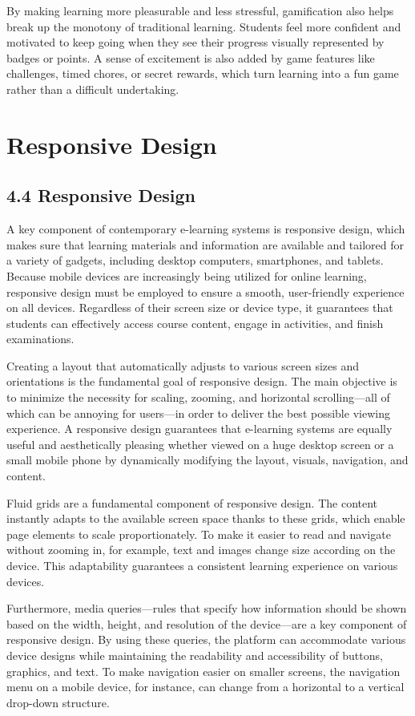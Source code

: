 \documentclass[BTech]{audiss}
\begin{document}
By making learning more pleasurable and less stressful, gamification also helps break up the monotony of traditional learning. Students feel more confident and motivated to keep going when they see their progress visually represented by badges or points. A sense of excitement is also added by game features like challenges, timed chores, or secret rewards, which turn learning into a fun game rather than a difficult undertaking.
\newpage
\section{Responsive Design}
\subsection{4.4 Responsive Design}
A key component of contemporary e-learning systems is responsive design, which makes sure that learning materials and information are available and tailored for a variety of gadgets, including desktop computers, smartphones, and tablets. Because mobile devices are increasingly being utilized for online learning, responsive design must be employed to ensure a smooth, user-friendly experience on all devices. Regardless of their screen size or device type, it guarantees that students can effectively access course content, engage in activities, and finish examinations.

Creating a layout that automatically adjusts to various screen sizes and orientations is the fundamental goal of responsive design. The main objective is to minimize the necessity for scaling, zooming, and horizontal scrolling---all of which can be annoying for users---in order to deliver the best possible viewing experience. A responsive design guarantees that e-learning systems are equally useful and aesthetically pleasing whether viewed on a huge desktop screen or a small mobile phone by dynamically modifying the layout, visuals, navigation, and content.

Fluid grids are a fundamental component of responsive design. The content instantly adapts to the available screen space thanks to these grids, which enable page elements to scale proportionately. To make it easier to read and navigate without zooming in, for example, text and images change size according on the device. This adaptability guarantees a consistent learning experience on various devices.

Furthermore, media queries---rules that specify how information should be shown based on the width, height, and resolution of the device---are a key component of responsive design. By using these queries, the platform can accommodate various device designs while maintaining the readability and accessibility of buttons, graphics, and text. To make navigation easier on smaller screens, the navigation menu on a mobile device, for instance, can change from a horizontal to a vertical drop-down structure.
\end{document}
